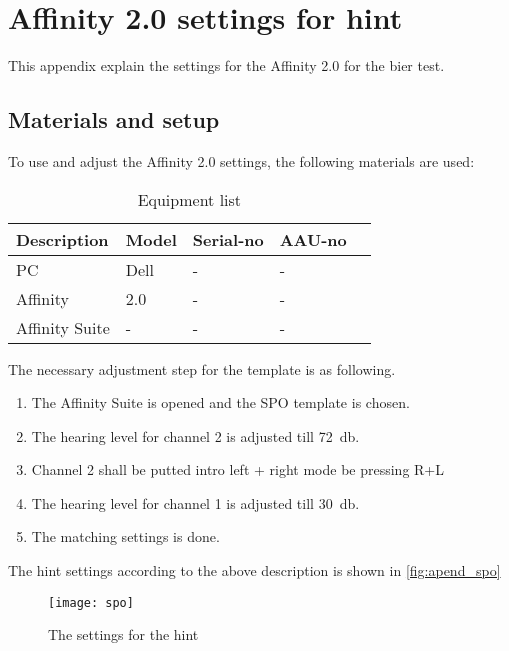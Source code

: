 \chapter{Affinity 2.0 settings for \gls{hint}}
\label{apend:aff_spo}
This appendix explain the settings for the Affinity 2.0 for the \gls{bier} test.

\section*{Materials and setup}
To use and adjust the Affinity 2.0 settings, the following materials are used:


\begin{table}[H]
\centering
\caption{Equipment list}
\begin{tabular}{l|l|l|l l}
Description         	& Model                                        & Serial-no  						& AAU-no \\ \hline
PC        			 		& Dell                                   & -  			& -  \\
Affinity     				& 2.0                            				& -   									& -  \\
Affinity Suite			& -                            				& -   									& - 
\end{tabular}
\end{table}

The necessary adjustment step for the template is as following.

\begin{enumerate}
\item The Affinity Suite is opened and the SPO template is chosen.
\item The hearing level for channel 2 is adjusted till \SI{72}{\decibel}.
\item  Channel 2 shall be putted intro left + right mode be pressing R+L
\item  The hearing level for channel 1 is adjusted till \SI{30}{\decibel}.
\item The matching settings is done.
\end{enumerate}

The \gls{hint} settings according to the above description is shown in \autoref{fig:apend_spo}



\begin{figure}[H]
	\centering
		\texttt{[image: spo]}
		\caption{The settings for the \gls{hint}}
		\label{fig:apend_spo}
\end{figure}

